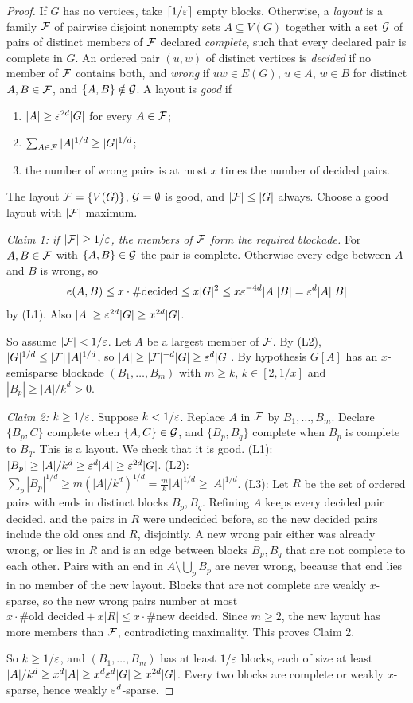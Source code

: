 \begin{proof}
If $G$ has no vertices, take $\lceil 1/\varepsilon\rceil$ empty blocks. Otherwise, a \emph{layout} is a family
$\mathcal{F}$ of pairwise disjoint nonempty sets $A\subseteq V(G)$ together with a set $\mathcal{G}$ of pairs of distinct
members of $\mathcal{F}$ declared \emph{complete}, such that every declared pair is complete in $G$. An ordered
pair $(u,w)$ of distinct vertices is \emph{decided} if no member of $\mathcal{F}$ contains both, and \emph{wrong}
if $uw\in E(G)$, $u\in A$, $w\in B$ for distinct $A,B\in\mathcal{F}$, and $\{A,B\}\notin\mathcal{G}$. A layout is \emph{good}
if
\begin{enumerate}[label=(L\arabic*)]
\item $|A|\ge\varepsilon^{2d}|G|$ for every $A\in\mathcal{F}$;
\item $\sum_{A\in\mathcal{F}}|A|^{1/d}\ge|G|^{1/d}$;
\item the number of wrong pairs is at most $x$ times the number of decided pairs.
\end{enumerate}
The layout $\mathcal{F}=\{V(G)\}$, $\mathcal{G}=\emptyset$ is good, and $|\mathcal{F}|\le|G|$ always. Choose a good layout with
$|\mathcal{F}|$ maximum.

\emph{Claim 1: if $|\mathcal{F}|\ge1/\varepsilon$, the members of $\mathcal{F}$ form the required blockade.} For $A,B\in\mathcal{F}$ with
$\{A,B\}\in\mathcal{G}$ the pair is complete. Otherwise every edge between $A$ and $B$ is wrong, so
\[
e(A,B)\le x\cdot\#\text{decided}\le x|G|^2\le x\varepsilon^{-4d}|A||B|=\varepsilon^d|A||B|
\]
by (L1). Also $|A|\ge\varepsilon^{2d}|G|\ge x^{2d}|G|$.

So assume $|\mathcal{F}|<1/\varepsilon$. Let $A$ be a largest member of $\mathcal{F}$. By (L2), $|G|^{1/d}\le|\mathcal{F}|\,|A|^{1/d}$, so
$|A|\ge|\mathcal{F}|^{-d}|G|\ge\varepsilon^d|G|$. By hypothesis $G[A]$ has an $x$-semisparse blockade $(B_1,\dots,B_m)$
with $m\ge k$, $k\in[2,1/x]$ and $|B_p|\ge|A|/k^d>0$.

\emph{Claim 2: $k\ge1/\varepsilon$.} Suppose $k<1/\varepsilon$. Replace $A$ in $\mathcal{F}$ by $B_1,\dots,B_m$. Declare $\{B_p,C\}$
complete when $\{A,C\}\in\mathcal{G}$, and $\{B_p,B_q\}$ complete when $B_p$ is complete to $B_q$. This is a layout.
We check that it is good.
(L1): $|B_p|\ge|A|/k^d\ge\varepsilon^d|A|\ge\varepsilon^{2d}|G|$.
(L2): $\sum_p|B_p|^{1/d}\ge m(|A|/k^d)^{1/d}=\frac mk|A|^{1/d}\ge|A|^{1/d}$.
(L3): Let $R$ be the set of ordered pairs with ends in distinct blocks $B_p,B_q$. Refining $A$ keeps every
decided pair decided, and the pairs in $R$ were undecided before, so the new decided pairs include the old
ones and $R$, disjointly. A new wrong pair either was already wrong, or lies in $R$ and is an edge between
blocks $B_p,B_q$ that are not complete to each other. Pairs with an end in $A\setminus\bigcup_pB_p$ are never
wrong, because that end lies in no member of the new layout. Blocks that are not complete are weakly
$x$-sparse, so the new wrong pairs number at most $x\cdot\#\text{old decided}+x|R|\le x\cdot\#\text{new
decided}$.
Since $m\ge2$, the new layout has more members than $\mathcal{F}$, contradicting maximality. This proves Claim 2.

So $k\ge1/\varepsilon$, and $(B_1,\dots,B_m)$ has at least $1/\varepsilon$ blocks, each of size at least $|A|/k^d\ge
x^d|A|\ge x^d\varepsilon^d|G|\ge x^{2d}|G|$. Every two blocks are complete or weakly $x$-sparse, hence weakly
$\varepsilon^d$-sparse.
\end{proof}

